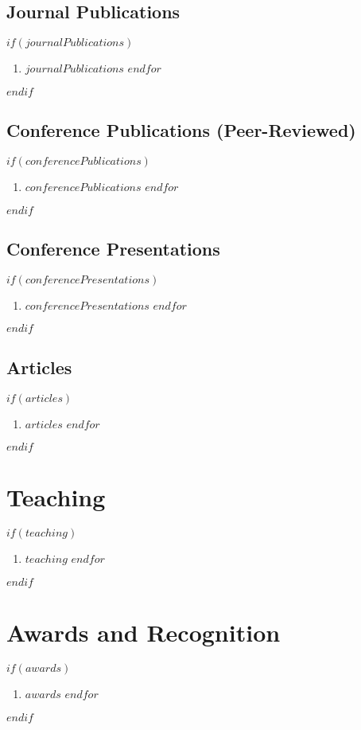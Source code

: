 \documentclass[$fontsize$, a4paper]{article}
\begin{document}
\subsection*{Journal Publications}
$if(journalPublications)$
\begin{enumerate}
$for(journalPublications)$
\item $journalPublications$
$endfor$
\end{enumerate}
$endif$

\subsection*{Conference Publications (Peer-Reviewed)}
$if(conferencePublications)$
\begin{enumerate}
$for(conferencePublications)$
\item $conferencePublications$
$endfor$
\end{enumerate}
$endif$

\subsection*{Conference Presentations}
$if(conferencePresentations)$
\begin{enumerate}
$for(conferencePresentations)$
\item $conferencePresentations$
$endfor$
\end{enumerate}
$endif$

\subsection*{Articles}
$if(articles)$
\begin{enumerate}
$for(articles)$
\item $articles$
$endfor$
\end{enumerate}
$endif$

\section*{Teaching}
$if(teaching)$
\begin{enumerate}
$for(teaching)$
\item $teaching$
$endfor$
\end{enumerate}
$endif$

\section*{Awards and Recognition}
$if(awards)$
\begin{enumerate}
$for(awards)$
\item $awards$
$endfor$
\end{enumerate}
$endif$
\end{document}
